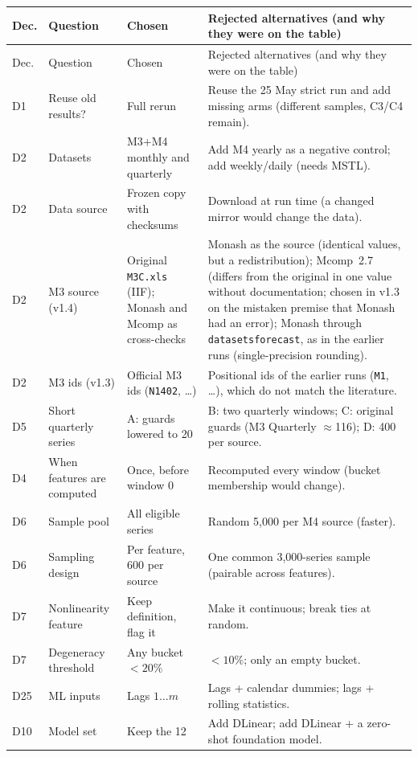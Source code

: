 \documentclass[11pt,a4paper]{article}
\newcommand{\code}[1]{\texttt{#1}}
\begin{document}
{\small
\begin{longtable}{@{}p{0.8cm} p{3.2cm} p{4.0cm} p{7.0cm}@{}}
\toprule
Dec. & Question & Chosen & Rejected alternatives (and why they were on the table) \\
\midrule
\endfirsthead
\toprule
Dec. & Question & Chosen & Rejected alternatives (and why they were on the table) \\
\midrule
\endhead
\bottomrule
\endfoot
D1 & Reuse old results? & Full rerun & Reuse the 25 May strict run and add missing arms (different samples, C3/C4 remain). \\
D2 & Datasets & M3+M4 monthly and quarterly & Add M4 yearly as a negative control; add weekly/daily (needs MSTL). \\
D2 & Data source & Frozen copy with checksums & Download at run time (a changed mirror would change the data). \\
D2 & M3 source (v1.4) & Original \code{M3C.xls} (IIF); Monash and Mcomp as cross-checks & Monash as the source (identical values, but a redistribution); Mcomp~2.7 (differs from the original in one value without documentation; chosen in v1.3 on the mistaken premise that Monash had an error); Monash through \code{datasetsforecast}, as in the earlier runs (single-precision rounding). \\
D2 & M3 ids (v1.3) & Official M3 ids (\code{N1402}, \dots) & Positional ids of the earlier runs (\code{M1}, \dots), which do not match the literature. \\
D5 & Short quarterly series & A: guards lowered to 20 & B: two quarterly windows; C: original guards (M3 Quarterly $\approx$116); D: 400 per source. \\
D4 & When features are computed & Once, before window 0 & Recomputed every window (bucket membership would change). \\
D6 & Sample pool & All eligible series & Random 5,000 per M4 source (faster). \\
D6 & Sampling design & Per feature, 600 per source & One common 3,000-series sample (pairable across features). \\
D7 & Nonlinearity feature & Keep definition, flag it & Make it continuous; break ties at random. \\
D7 & Degeneracy threshold & Any bucket $< 20\%$ & $< 10\%$; only an empty bucket. \\
D25 & ML inputs & Lags $1\dots m$ & Lags + calendar dummies; lags + rolling statistics. \\
D10 & Model set & Keep the 12 & Add DLinear; add DLinear + a zero-shot foundation model. \\

\end{longtable}}
\end{document}

